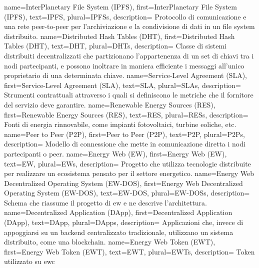 {
    name={InterPlanetary File System (IPFS)},
    first={InterPlanetary File System (IPFS)},
    text={IPFS},
    plural={IPFSs},
    description={
            Protocollo di comunicazione e una rete peer-to-peer per l'archiviazione e la condivisione di dati in un file system distribuito.
        }
}
{
    name={Distributed Hash Tables (DHT)},
    first={Distributed Hash Tables (DHT)},
    text={DHT},
    plural={DHTs},
    description={
            Classe di sistemi distribuiti decentralizzati che partizionano l'appartenenza di un set di chiavi tra i nodi partecipanti,
            e possono inoltrare in maniera efficiente i messaggi all'unico proprietario di una determinata chiave.
        }
}
{
    name={Service-Level Agreement (SLA)},
    first={Service-Level Agreement (SLA)},
    text={SLA},
    plural={SLAs},
    description={
            Strumenti contrattuali attraverso i quali si definiscono le metriche che il fornitore del servizio deve garantire.
        }
}
{
    name={Renewable Energy Sources (RES)},
    first={Renewable Energy Sources (RES)},
    text={RES},
    plural={RESs},
    description={
            Fonti di energia rinnovabile, come impianti fotovoltaici, turbine eoliche, etc.
        }
}
{
    name={Peer to Peer (P2P)},
    first={Peer to Peer (P2P)},
    text={P2P},
    plural={P2Ps},
    description={
            Modello di connessione che mette in comunicazione diretta i nodi partecipanti o peer.
        }
}
{
    name={Energy Web (EW)},
    first={Energy Web (EW)},
    text={EW},
    plural={EWs},
    description={
            Progetto che utilizza tecnologie distribuite per realizzare un ecosistema pensato per il settore energetico.
        }
}
{
    name={Energy Web Decentralized Operating System (EW-DOS)},
    first={Energy Web Decentralized Operating System (EW-DOS)},
    text={EW-DOS},
    plural={EW-DOSs},
    description={
            Schema che riassume il progetto di \gls{ew} e ne descrive l'architettura.
        }
}
{
    name={Decentralized Application (DApp)},
    first={Decentralized Application (DApp)},
    text={DApp},
    plural={DApps},
    description={
            Applicazioni che, invece di appoggiarsi su un backend centralizzato tradizionale,
            utilizzano un sistema distribuito, come una blockchain.
        }
}
{
    name={Energy Web Token (EWT)},
    first={Energy Web Token (EWT)},
    text={EWT},
    plural={EWTs},
    description={
            Token utilizzato su \gls{ewc}
        }
}
